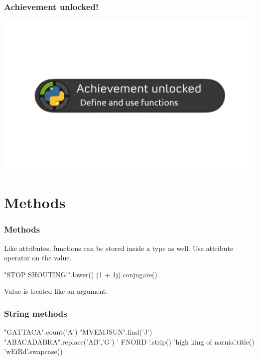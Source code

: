\documentclass[11pt]{beamer}
\begin{document}
\begin{frame}
  \frametitle{Achievement unlocked!}
  \includegraphics[width=\textwidth]{./img/achievement_unlocked-functions.png}
\end{frame}

\section{Methods}

\begin{frame}[fragile]
  \frametitle{Methods}
  \Enlarge

  \begin{itemize}
  \myitem  Like attributes, functions can be stored inside a type as well.
  \myitem  Use attribute operator on the value.
    \begin{semiverbatim}
"STOP SHOUTING!".lower()
(1 + 1j).conjugate()
    \end{semiverbatim}
  \myitem  Value is treated like an argument.
  \end{itemize}
\end{frame}

\begin{frame}[fragile]
  \frametitle{String methods}
  \Enlarge

  \begin{semiverbatim}
"GATTACA".count('A')
"MVEMJSUN".find('J')
"ABACADABRA".replace('AB','G')
' FNORD '.strip()
'high king of narnia'.title()
'wEiRd'.swapcase()
  \end{semiverbatim}
\end{frame}
\end{document}
